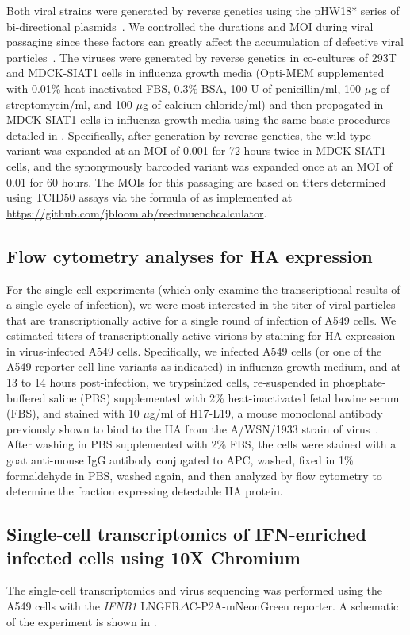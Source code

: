 \documentclass[9pt,lineno]{template}
\begin{document}
Both viral strains were generated by reverse genetics using the pHW18* series of bi-directional plasmids~\citep{hoffmann2000dna}.
We controlled the durations and MOI during viral passaging since these factors can greatly affect the accumulation of defective viral particles~\citep{xue2016propagation}.
The viruses were generated by reverse genetics in co-cultures of 293T and MDCK-SIAT1 cells in influenza growth media (Opti-MEM supplemented with 0.01\% heat-inactivated FBS, 0.3\% BSA, 100 U of penicillin/ml, 100 $\mu$g of streptomycin/ml, and 100 $\mu$g of calcium chloride/ml) and then propagated in MDCK-SIAT1 cells in influenza growth media using the same basic procedures detailed in \citet{russell2018extreme}.
Specifically, after generation by reverse genetics, the wild-type variant was expanded at an MOI of 0.001 for 72 hours twice in MDCK-SIAT1 cells, and the synonymously barcoded variant was expanded once at an MOI of 0.01 for 60 hours.
The MOIs for this passaging are based on titers determined using TCID50 assays via the formula of \citet{reed1938simple} as implemented at \url{https://github.com/jbloomlab/reedmuenchcalculator}.

\subsection{Flow cytometry analyses for HA expression}
For the single-cell experiments (which only examine the transcriptional results of a single cycle of infection), we were most interested in the titer of viral particles that are transcriptionally active for a single round of infection of A549 cells.
We estimated titers of transcriptionally active virions by staining for HA expression in virus-infected A549 cells.
Specifically, we infected A549 cells (or one of the A549 reporter cell line variants as indicated) in influenza growth medium, and at 13 to 14 hours post-infection, we trypsinized cells, re-suspended in phosphate-buffered saline (PBS) supplemented with 2\% heat-inactivated fetal bovine serum (FBS), and stained with 10 $\mu$g/ml of H17-L19, a mouse monoclonal antibody previously shown to bind to the HA from the A/WSN/1933 strain of virus~\citep{doud2017complete}.
After washing in PBS supplemented with 2\% FBS, the cells were stained with a goat anti-mouse IgG antibody conjugated to APC, washed, fixed in 1\% formaldehyde in PBS, washed again, and then analyzed by flow cytometry to determine the fraction expressing detectable HA protein.

\subsection{Single-cell transcriptomics of IFN-enriched infected cells using 10X Chromium}
The single-cell transcriptomics and virus sequencing was performed using the A549 cells with the \textit{IFNB1} LNGFR$\Delta$C-P2A-mNeonGreen reporter.
A schematic of the experiment is shown in .
\end{document}
